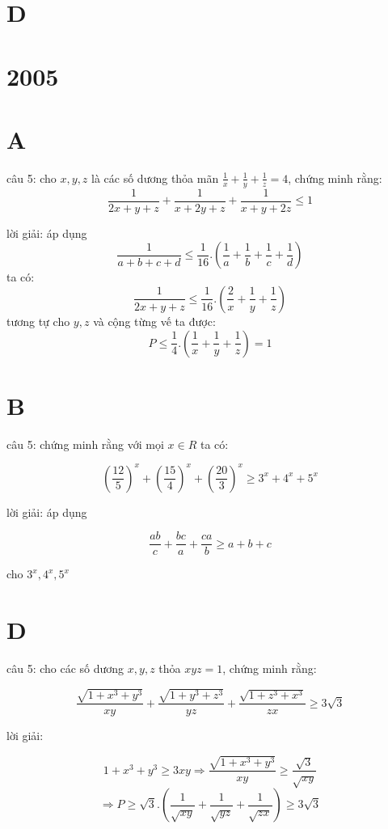 \documentclass{article}
\begin{document}
\section*{D}

\section*{2005}
\section*{A}

câu 5: cho $x,y,z$ là các số dương thỏa mãn $\frac{1}{x}+\frac{1}{y}+\frac{1}{z}=4$, chứng minh rằng:
\[\frac{1}{2x+y+z}+\frac{1}{x+2y+z}+\frac{1}{x+y+2z}\leq1\]

lời giải: áp dụng
\[\frac{1}{a+b+c+d}\leq\frac{1}{16}.(\frac{1}{a}+\frac{1}{b}+\frac{1}{c}+\frac{1}{d})\]
ta có:
\[\frac{1}{2x+y+z}\leq\frac{1}{16}.(\frac{2}{x}+\frac{1}{y}+\frac{1}{z})\]
tương tự cho $y,z$ và cộng từng vế ta được:
\[P\leq\frac{1}{4}.(\frac{1}{x}+\frac{1}{y}+\frac{1}{z})=1\]

\section*{B}


câu 5: chứng minh rằng với mọi $x\in R $ ta có:

\[(\frac{12}{5})^x+(\frac{15}{4})^x+(\frac{20}{3})^x\geq3^x+4^x+5^x\]

lời giải: áp dụng






\[\frac{ab}{c}+\frac{bc}{a}+\frac{ca}{b}\geq a+b+c\]

cho $3^x, 4^x, 5^x$

\section*{D}

câu 5: cho các số dương $x,y,z$ thỏa $xyz=1$, chứng minh rằng:

\[\frac{\sqrt{1+x^3+y^3}}{xy}+\frac{\sqrt{1+y^3+z^3}}{yz}+\frac{\sqrt{1+z^3+x^3}}{zx}\geq 3\sqrt{3}\]

lời giải:


\[1+x^3+y^3\geq3xy\Rightarrow \frac{\sqrt{1+x^3+y^3}}{xy}\geq \frac{\sqrt{3}}{\sqrt{xy}}\]
\[\Rightarrow P\geq \sqrt{3}.(\frac{1}{\sqrt{xy}}+\frac{1}{\sqrt{yz}}+\frac{1}{\sqrt{zx}})\geq3\sqrt{3}\]
\end{document}
